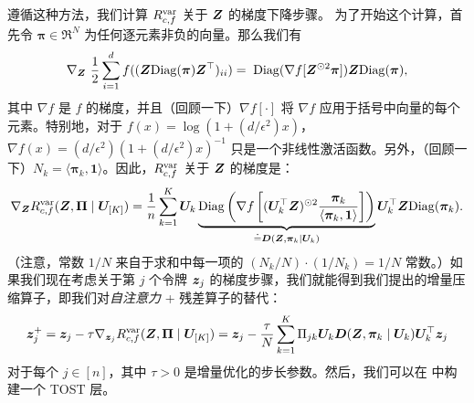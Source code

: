 \documentclass[../../book-main.tex]{subfiles}
\begin{document}
遵循这种方法，我们计算 $R_{c,f}^{\rm var}$ 关于 $\bm{Z}$ 的梯度下降步骤。
为了开始这个计算，首先令 $\bm \pi \in \Re^N$ 为任何逐元素非负的向量。那么我们有
\begin{equation}\label{eq1:grad Rcf}
\nabla_{\Z} \ \frac{1}{2} \sum_{i = 1}^{d} f(  (\Z \mathrm{Diag}(\bm \pi) \Z^{\top} )_{ii}) %
= \; \mathrm{Diag}(\nabla f[ \Z^{\odot 2} \bm \pi] ) \Z \mathrm{Diag}(\bm \pi),
\end{equation}
%
其中 $\nabla f$ 是 $f$ 的梯度，并且（回顾一下）$\nabla f[\cdot]$ 将 $\nabla f$ 应用于括号中向量的每个元素。特别地，对于 $ f(x) = \log(1 + (d/\epsilon^{2}) x)$，$\nabla f(x) = (d / \epsilon^{2}) (1+ (d / \epsilon^{2}) x)^{-1}$ 只是一个非线性激活函数。另外，（回顾一下）$N_{k} = \langle \bm \pi_{k}, \bm 1\rangle$。因此，$R^{\rm var}_{c,f}$ 关于 $\bm{Z}$ 的梯度是：
\begin{align}\label{eq2:grad Rcf}
    \nabla_{\bm{Z}} R^{\rm var}_{c,f}(\bm{Z},\bm \Pi \mid \bm U_{[K]}) =  \frac{1}{n} \sum_{k=1}^K \bm U_{k} \underbrace{\mathrm{Diag} \left( \nabla f\left[ (\bm U_{k}^{\top} \bm{Z})^{\odot 2}  \frac{\bm \pi_k}{\langle \bm \pi_{k}, \bm 1\rangle} \right] \right)}_{\doteq \bm D(\bm{Z}, \bm \pi_{k} \mid \bm U_{k})} \bm U_{k}^{\top} \bm{Z} \mathrm{Diag}(\bm \pi_k).
\end{align}
（注意，常数 $1/N$ 来自于求和中每一项的 $(N_{k}/N)\cdot (1/N_{k}) = 1/N$ 常数。）如果我们现在考虑关于第 $j$ 个令牌 $\bm{z}_j$ 的梯度步骤，我们就能得到我们提出的增量压缩算子，即我们对\textit{自注意力} + 残差算子的替代：
%
\vspace{-2mm}
\begin{equation}\label{eq:layer-operation-orig}
    \bm{z}_j^+ = \bm{z}_{j} - \tau \nabla_{\bm{z}_{j}}R_{c, f}^{\rm var}(\bm{Z}, \bm \Pi \mid \bm U_{[K]}) = \bm{z}_j - \frac{\tau}{N} \sum_{k=1}^K \Pi_{jk} \bm U_{k} \bm D(\bm{Z}, \bm \pi_{k} \mid \bm U_{k}) \bm U_{k}^{\top} \bm{z}_j
\end{equation}
对于每个 \(j \in [n]\)，其中 $\tau > 0$ 是增量优化的步长参数。然后，我们可以在  中构建一个 TOST 层。
\end{document}
